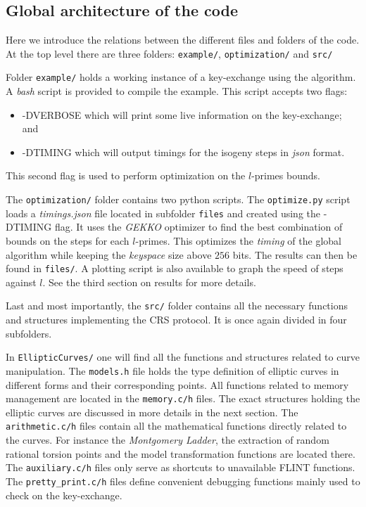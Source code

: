 \documentclass[../main.tex]{subfilesubs}
\begin{document}
\subsection{Global architecture of the code}
Here we introduce the relations between the different files and folders of the code.
At the top level there are three folders: \texttt{example/}, \texttt{optimization/} and \texttt{src/}

Folder \texttt{example/} holds a working instance of a key-exchange using the algorithm.
A \textit{bash} script is provided to compile the example.
This script accepts two flags:
	\begin{itemize}
		\item -DVERBOSE which will print some live information on the key-exchange; and
		\item -DTIMING which will output timings for the isogeny steps in \textit{json} format.
	\end{itemize}
This second flag is used to perform optimization on the $l$-primes bounds.

The \texttt{optimization/} folder contains two python scripts.
The \texttt{optimize.py} script loads a \textit{timings.json} file located in subfolder \texttt{files} and created using the -DTIMING flag.
It uses the \textit{GEKKO} optimizer to find the best combination of bounds on the steps for each $l$-primes.
This optimizes the \textit{timing} of the global algorithm while keeping the \textit{keyspace} size above $256$ bits.
The results can then be found in \texttt{files/}.
A plotting script is also available to graph the speed of steps against $l$.
See the third section on results for more details.

Last and most importantly, the \texttt{src/} folder contains all the necessary functions and structures implementing the CRS protocol.
It is once again divided in four subfolders.

In \texttt{EllipticCurves/} one will find all the functions and structures related to curve manipulation.
The \texttt{models.h} file holds the type definition of elliptic curves in different forms and their corresponding points.
All functions related to memory management are located in the \texttt{memory.c/h} files.
The exact structures holding the elliptic curves are discussed in more details in the next section.
The \texttt{arithmetic.c/h} files contain all the mathematical functions directly related to the curves.
For instance the \textit{Montgomery Ladder}, the extraction of random rational torsion points and the model transformation functions are located there.
The \texttt{auxiliary.c/h} files only serve as shortcuts to unavailable FLINT functions.
The \texttt{pretty\_print.c/h} files define convenient debugging functions mainly used to check on the key-exchange.
\end{document}
